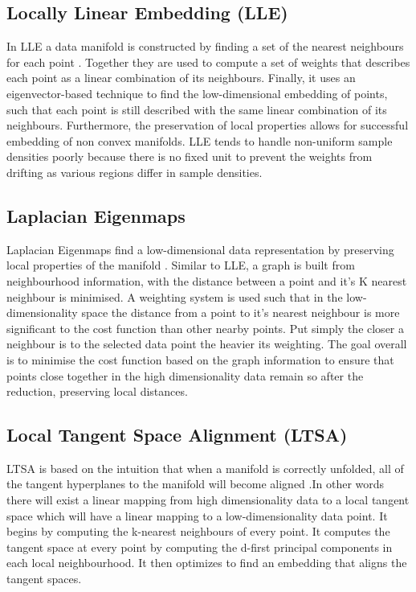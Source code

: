 \subsection{Locally Linear Embedding (LLE)}
In LLE a data manifold is constructed by finding a set of the nearest neighbours for each point \cite{Roweis2000}. Together they are used to compute a set of weights that describes each point as a linear combination of its neighbours. Finally, it uses an eigenvector-based technique to find the low-dimensional embedding of points, such that each point is still described with the same linear combination of its neighbours. Furthermore, the preservation of local properties allows for successful embedding of non convex manifolds.
LLE tends to handle non-uniform sample densities poorly because there is no fixed unit to prevent the weights from drifting as various regions differ in sample densities.

\subsection{Laplacian Eigenmaps}
Laplacian Eigenmaps find a low-dimensional data representation by preserving local properties of the manifold \cite{Belkin2003}. Similar to LLE, a graph is built from neighbourhood information, with the distance between a point and it's K nearest neighbour is minimised. A weighting system is used such that in the low-dimensionality space the distance from a point to it's nearest neighbour is more significant to the cost function than other nearby points. Put simply the closer a neighbour is to the selected data point the heavier its weighting. The goal overall is to minimise the cost function based on the graph information to ensure that points close together in the high dimensionality data remain so after the reduction, preserving local distances. 


\subsection{Local Tangent Space Alignment (LTSA)}
LTSA is based on the intuition that when a manifold is correctly unfolded, all of the tangent hyperplanes to the manifold will become aligned \cite{Zhang2003} .In other words there will exist a linear mapping from high dimensionality data to a local tangent space which will have a linear mapping to a low-dimensionality data point. It begins by computing the k-nearest neighbours of every point. It computes the tangent space at every point by computing the d-first principal components in each local neighbourhood. It then optimizes to find an embedding that aligns the tangent spaces.


